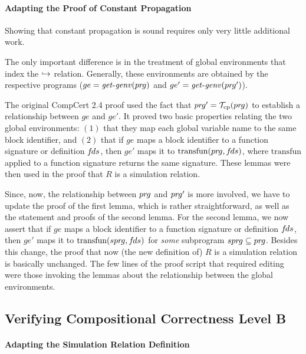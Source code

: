 \paragraph{Adapting the Proof of Constant Propagation}

Showing that constant propagation is sound requires only very little additional work.

The only important difference is in the treatment of global environments that index the $\stackrel{}{\hookrightarrow}$ relation.
Generally, these environments are obtained by the respective programs ($ge=\mathit{get\text{-}genv}({pr\hspace*{-1pt}g})$ and $ge'=\mathit{get\text{-}genv}({pr\hspace*{-1pt}g}')$). 

The original CompCert 2.4 proof used the fact that
${pr\hspace*{-1pt}g}'=\mathcal{T}_{\rm cp}({pr\hspace*{-1pt}g})$ to establish a relationship
between $ge$ and $ge'$.  It proved two basic properties relating the
two global environments: $(1)$ that they map each global variable name
to the same block identifier, and $(2)$ that if $ge$ maps a block
identifier to a function signature or definition ${f\hspace*{-1pt}ds}$, then $ge'$
maps it to $\mathrm{transfun}({pr\hspace*{-1pt}g},{f\hspace*{-1pt}ds})$, where $\mathrm{transfun}$
applied to a function signature returns the same signature.  These
lemmas were then used in the proof that $R$ is a simulation relation.

Since, now, the relationship between ${pr\hspace*{-1pt}g}$ and ${pr\hspace*{-1pt}g}'$ is more involved, 
we have to update the proof of the first lemma, which is rather straightforward,
as well as the statement and proofs of the second lemma.
For the second lemma, we now assert that 
if $ge$ maps a block identifier to a function signature or definition ${f\hspace*{-1pt}ds}$, 
then $ge'$ maps it to $\mathrm{transfun}({spr\hspace*{-1pt}g},{f\hspace*{-1pt}ds})$ for \emph{some} subprogram ${spr\hspace*{-1pt}g}\subseteq{pr\hspace*{-1pt}g}$.
Besides this change, 
the proof that now (the new definition of) $R$ is a simulation relation is basically unchanged.
The few lines of the proof script that required editing were those invoking the lemmas about the relationship between the global environments.


\subsection{Verifying Compositional Correctness Level B}

\paragraph{Adapting the Simulation Relation Definition}

